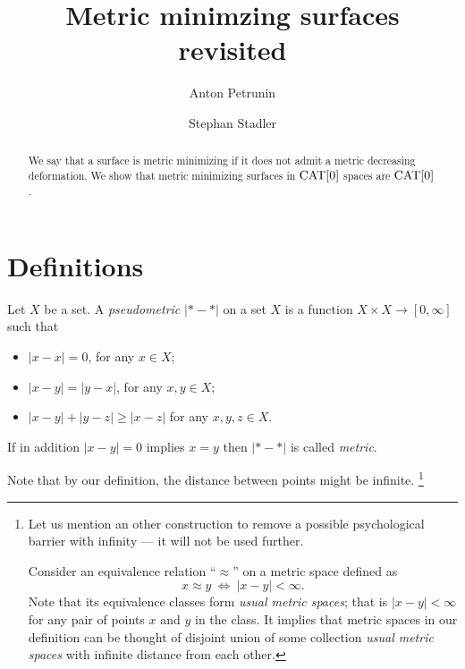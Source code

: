 \documentclass[a4paper,10pt]{amsart}
\begin{document}
\title{Metric minimzing surfaces revisited}
\author{Anton Petrunin}
\address{A. Petrunin\newline\vskip-4mm
Math. Dept. PSU,
University Park, PA 16802,
USA}
\author{Stephan Stadler}
\address{S. Stadler\newline\vskip-4mm
Math. Inst.,
Universit\"at M\"unchen, Theresienstr. 39, D-80333 M\"unchen, Germany}


\date{}

\begin{abstract}
We say that a surface is metric minimizing if it does not admit a metric decreasing deformation.
We show that metric minimizing surfaces in $\mathop{\rm CAT}\nolimits[0]$ spaces are $\mathop{\rm CAT}\nolimits[0]$.
\end{abstract}
\maketitle



\section{Definitions}

Let $X$ be a set.
A \emph{pseudometric} $|{*}-{*}|$ on a set $X$ 
is a function $X\times X\to[0,\infty]$
such that 
\begin{itemize}
\item $|x-x|=0$, for any $x\in X$;
\item $|x-y|=|y-x|$, for any $x,y\in X$;
\item $|x-y|+|y-z|\ge|x-z|$ for any  $x,y,z\in X$.
\end{itemize}

If in addition $|x-y|=0$ implies $x=y$ then $|{*}-{*}|$ is called \emph{metric}.

Note that by our definition, the distance between points might be infinite.%
\footnote{Let us mention an other construction to remove a possible psychological barrier with infinity --- it will not be used further.

Consider an equivalence relation ``$\approx$'' on a metric space defined as \[x\approx y\  \iff\  |x-y|<\infty.\]
Note that its equivalence classes form \emph{usual metric spaces}; 
that is $|x-y|<\infty$ for any pair of points $x$ and $y$ in the class.
It implies that metric spaces in our definition 
can be thought of disjoint union of some collection \emph{usual metric spaces} with infinite distance from each other.}
\end{document}
